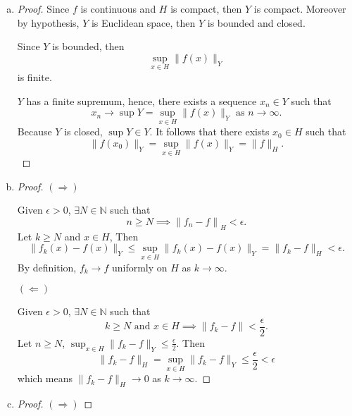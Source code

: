\begin{Exercise}
\begin{enumerate}[a)]
\item
\begin{proof}
Since $f$ is continuous and $H$ is compact, then $Y$ is compact. Moreover by hypothesis, $Y$ is Euclidean space, then $Y$ is bounded and closed.

Since $Y$ is bounded, then
$$
\sup_{x\in H} \| f(x) \|_Y
$$ is finite.

$Y$ has a finite supremum, hence, there exists a sequence $x_n\in Y$ such that
$$
x_n\to \sup Y = \sup_{x\in H} \| f(x) \|_Y \text{ as } n\to\infty.
$$
Because $Y$ is closed, $\sup Y\in Y$. It follows that
there exists $x_0\in H$ such that
$$
\| f(x_0) \|_Y = \sup_{x\in H} \| f(x) \|_Y = \| f \|_H.
$$
\end{proof}

\item
\begin{proof}
$(\Longrightarrow)$

Given $\epsilon>0$, $\exists N\in\mathbb{N}$ such that
$$
n\geq N \implies \left\| f_n - f \right\|_H < \epsilon.
$$
Let $k\geq N$ and $x\in H$, Then
$$
\| f_k(x)-f(x) \|_Y \leq \sup_{x\in H} \| f_k(x)-f(x) \|_Y = \| f_k-f \|_H < \epsilon.
$$
By definition, $f_k\to f$ uniformly on $H$ as $k\to\infty$.

\vspace{2ex}

$(\Longleftarrow)$

Given $\epsilon>0$, $\exists N\in\mathbb{N}$ such that
$$
k\geq N \text { and } x\in H \implies \| f_k - f \| < \frac{\epsilon}{2}.
$$
Let $n\geq N$, $\sup_{x\in H} \| f_k - f \|_Y \leq \frac{\epsilon}{2}$. Then
$$
\| f_k-f \|_H = \sup_{x\in H} \| f_k - f \|_Y \leq \frac{\epsilon}{2} < \epsilon
$$
which means $\| f_k-f \|_H \to 0$ as $k\to\infty$.
\end{proof}

\item
\begin{proof}
$(\Longrightarrow)$


\end{proof}
\end{enumerate}
\end{Exercise}
